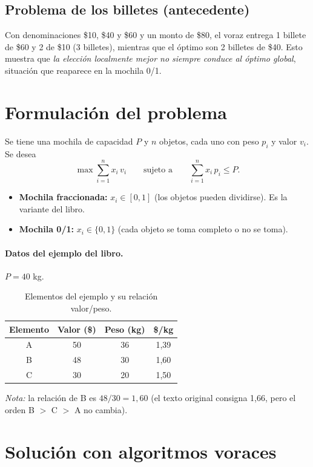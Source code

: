 \documentclass[12pt,a4paper]{article}
\begin{document}
\subsection{Problema de los billetes (antecedente)}
Con denominaciones \$10, \$40 y \$60 y un monto de \$80, el voraz entrega 1 billete de \$60 y 2 de \$10 (3 billetes), mientras que el óptimo son 2 billetes de \$40. Esto muestra que \emph{la elección localmente mejor no siempre conduce al óptimo global}, situación que reaparece en la mochila 0/1.

\section{Formulación del problema}
Se tiene una mochila de capacidad $P$ y $n$ objetos, cada uno con peso $p_i$ y valor $v_i$. Se desea
\[
\max \sum_{i=1}^{n} x_i\, v_i \qquad \text{sujeto a} \qquad \sum_{i=1}^{n} x_i\, p_i \le P .
\]
\begin{itemize}
  \item \textbf{Mochila fraccionada:} $x_i \in [0,1]$ (los objetos pueden dividirse). Es la variante del libro.
  \item \textbf{Mochila 0/1:} $x_i \in \{0,1\}$ (cada objeto se toma completo o no se toma).
\end{itemize}

\paragraph{Datos del ejemplo del libro.} $P = 40$ kg.
\begin{table}[H]
\centering
\begin{tabular}{cccc}
\toprule
Elemento & Valor (\$) & Peso (kg) & \$/kg \\
\midrule
A & 50 & 36 & 1,39 \\
B & 48 & 30 & 1,60 \\
C & 30 & 20 & 1,50 \\
\bottomrule
\end{tabular}
\caption{Elementos del ejemplo y su relación valor/peso.}
\end{table}
\noindent\textit{Nota:} la relación de B es $48/30 = 1{,}60$ (el texto original consigna 1,66, pero el orden B $>$ C $>$ A no cambia).

\section{Solución con algoritmos voraces}
\end{document}
